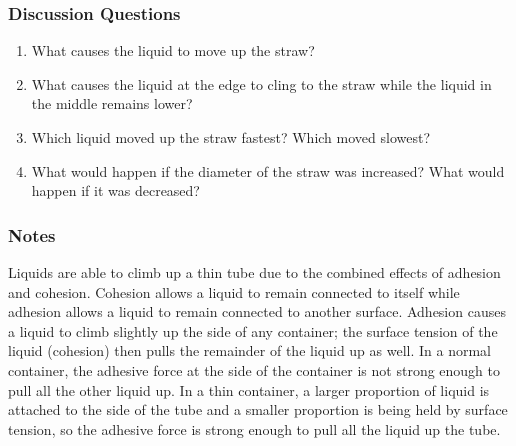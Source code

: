 \subsubsection*{Discussion Questions}
\begin{enumerate}
\item{What causes the liquid to move up the straw?}
\item{What causes the liquid at the edge to cling to the straw while the liquid in the middle remains lower?}
\item{Which liquid moved up the straw fastest? Which moved slowest?}
\item{What would happen if the diameter of the straw was increased? What would happen if it was decreased?}
\end{enumerate}

\subsubsection*{Notes}
Liquids are able to climb up a thin tube due to the combined effects of adhesion and cohesion. Cohesion allows a liquid to remain connected to itself while adhesion allows a liquid to remain connected to another surface. Adhesion causes a liquid to climb slightly up the side of any container; the surface tension of the liquid (cohesion) then pulls the remainder of the liquid up as well. In a normal container, the adhesive force at the side of the container is not strong enough to pull all the other liquid up. In a thin container, a larger proportion of liquid is attached to the side of the tube and a smaller proportion is being held by surface tension, so the adhesive force is strong enough to pull all the liquid up the tube.
